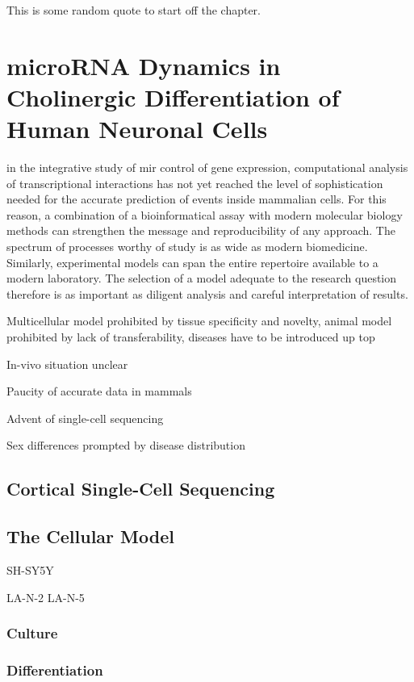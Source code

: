 \begin{savequote}[75mm]
This is some random quote to start off the chapter.
\end{savequote}

\chapter{microRNA Dynamics in Cholinergic Differentiation of Human Neuronal Cells}

 in the integrative study of \ac{mir} control of gene expression, computational analysis of transcriptional interactions has not yet reached the level of sophistication needed for the accurate prediction of events inside mammalian cells. For this reason, a combination of a bioinformatical assay with modern molecular biology methods can strengthen the message and reproducibility of any approach. The spectrum of processes worthy of study is as wide as modern biomedicine. Similarly, experimental models can span the entire repertoire available to a modern laboratory. The selection of a model adequate to the research question therefore is as important as diligent analysis and careful interpretation of results.

Multicellular model prohibited by tissue specificity and novelty, animal model prohibited by lack of transferability, diseases have to be introduced up top

In-vivo situation unclear

Paucity of accurate data in mammals

Advent of single-cell sequencing

Sex differences prompted by disease distribution

\section{Cortical Single-Cell Sequencing}
\section{The Cellular Model}
SH-SY5Y

LA-N-2\cite{McManaman1988} LA-N-5\cite{Hill1997}
\subsection{Culture}
\subsection{Differentiation}
